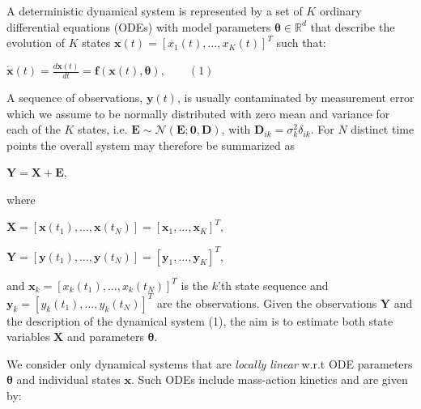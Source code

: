 \begin{par}
A deterministic dynamical system is represented by a set of $K$ ordinary differential equations (ODEs) with model parameters $\boldsymbol\theta \in \mathbb{R}^d$ that describe the evolution of $K$ states $\mathbf{x}(t) = [x_1(t),\ldots, x_K(t)]^T$ such that:
\end{par} \vspace{1em}
\begin{par}
$\dot{\mathbf{x}}(t) = \frac{d \mathbf{x}(t)}{d t} = \mathbf{f}(\mathbf{x}(t),\boldsymbol\theta), \qquad (1)$
\end{par} \vspace{1em}
\begin{par}
A sequence of observations, $\mathbf{y}(t)$, is usually contaminated by measurement error which we assume to be normally distributed with zero mean and variance for each of the $K$ states, i.e. $\mathbf{E}\sim\mathcal{N}(\mathbf{E};\mathbf{0},\mathbf{D})$, with $\mathbf{D}_{ik}=\sigma_k ^2 \delta_{ik}$. For $N$ distinct time points the overall system may therefore be summarized as
\end{par} \vspace{1em}
\begin{par}
$\mathbf{Y} = \mathbf{X} + \mathbf{E},$
\end{par} \vspace{1em}
\begin{par}
where
\end{par} \vspace{1em}
\begin{par}
$\mathbf{X} = [\mathbf{x}(t_1),\ldots,\mathbf{x}(t_N)] =  [\mathbf{x}_1,\ldots,\mathbf{x}_K]^T,$
\end{par} \vspace{1em}
\begin{par}
$\mathbf{Y} = [\mathbf{y}(t_1),\ldots,\mathbf{y}(t_N)] =  [\mathbf{y}_1,\ldots,\mathbf{y}_K]^T,$
\end{par} \vspace{1em}
\begin{par}
and $\mathbf{x}_k = [x_k(t_1),\ldots,x_k(t_N)]^T$ is the $k$'th state sequence and $\mathbf{y}_k = [y_k(t_1),\ldots,y_k(t_N)]^T$ are the observations. Given the observations $\mathbf{Y}$ and the description of the dynamical system (1), the aim is to estimate both state variables $\mathbf{X}$ and parameters $\boldsymbol\theta$.
\end{par} \vspace{1em}
\begin{par}
We consider only dynamical systems that are \textit{locally linear} w.r.t ODE parameters $\boldsymbol\theta$ and individual states $\mathbf{x}$. Such ODEs include mass-action kinetics and are given by:
\end{par} \vspace{1em}
